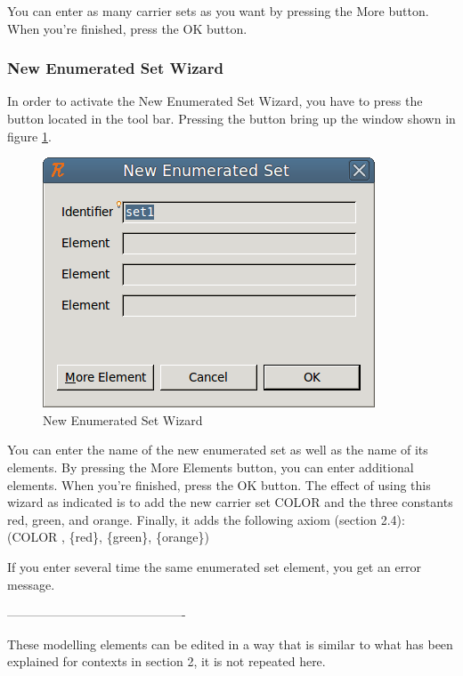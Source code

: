 You can enter as many carrier sets as you want by pressing the \textsf{More} button. When you’re finished, press the \textsf{OK} button. 

\subsubsection{New Enumerated Set Wizard}

In order to activate the \textsf{New Enumerated Set Wizard}, you have to press the  button located in the tool bar. Pressing the button bring up the window shown in figure \ref{fig_ref_01_eventb_editor5}.

\begin{figure}[!h]
\begin{center}
	\includegraphics{img/reference/ref_01_eventb_editor5.png}
	\caption{New Enumerated Set Wizard}
	\label{fig_ref_01_eventb_editor5}
\end{center}
\end{figure}

You can enter the name of the new enumerated set as well as the name of its elements. By pressing the \textsf{More Elements} button, you can enter additional elements. When you’re finished, press the \textsf{OK} button. The effect of using this wizard as indicated is to add the new carrier set COLOR and the three constants red, green, and orange. Finally, it adds the following axiom (section 2.4):
(COLOR , \{red\}, \{green\}, \{orange\})

If you enter several time the same enumerated set element, you get an error message. 

-------------------------------------------

These modelling elements can be edited in a way that is similar to what has been explained for contexts in section 2, it is not repeated here.


